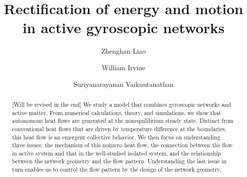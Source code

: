 \documentclass[
 preprint,
 preprintnumbers,
 amsmath,amssymb,
 aps,
 pre,
 longbibliography,
 superscriptaddress,
 10pt, twocolumn
]{revtex4-1}
\begin{document}
\newcommand{\eqnname}{Eqn.}
\newcommand{\secname}{Sec.}


\title{Rectification of energy and motion in active gyroscopic networks}


\author{Zhenghan Liao}
\author{William Irvine}
\author{Suriyanarayanan Vaikuntanathan}


\begin{abstract}
[Will be revised in the end] We study a model that combines gyroscopic networks and active matter. From numerical calculations, theory, and simulations, we show that autonomous heat flows are generated at the nonequilibrium steady state. Distinct from conventional heat flows that are driven by temperature difference at the boundaries, this heat flow is an emergent collective behavior.
We then focus on understanding three issues: the mechanism of this nonzero heat flow, the connection between the flow in active system and that in the well-studied isolated system, and the relationship between the network geometry and the flow pattern.
Understanding the last issue in turn enables us to control the flow pattern by the design of the network geometry.
\end{abstract}

\maketitle
\end{document}
